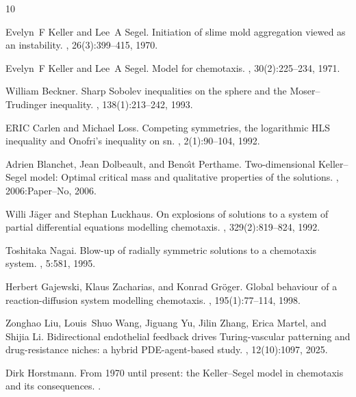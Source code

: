 \documentclass[11pt,reqno]{amsart}
\theoremstyle{definition}
\theoremstyle{remark}
\begin{document}
\begin{thebibliography}{10}

Evelyn~F Keller and Lee~A Segel.
\newblock Initiation of slime mold aggregation viewed as an instability.
, 26(3):399--415, 1970.

Evelyn~F Keller and Lee~A Segel.
\newblock Model for chemotaxis.
, 30(2):225--234, 1971.

William Beckner.
\newblock Sharp {S}obolev inequalities on the sphere and the {M}oser--{T}rudinger inequality.
, 138(1):213--242, 1993.

ERIC Carlen and Michael Loss.
\newblock Competing symmetries, the logarithmic {H}{L}{S} inequality and {O}nofri's inequality on sn.
, 2(1):90--104, 1992.

Adrien Blanchet, Jean Dolbeault, and Beno{\^\i}t Perthame.
\newblock Two-dimensional {K}eller--{S}egel model: {O}ptimal critical mass and qualitative properties of the solutions.
, 2006:Paper--No, 2006.

Willi J{\"a}ger and Stephan Luckhaus.
\newblock On explosions of solutions to a system of partial differential equations modelling chemotaxis.
, 329(2):819--824, 1992.

Toshitaka Nagai.
\newblock Blow-up of radially symmetric solutions to a chemotaxis system.
, 5:581, 1995.

Herbert Gajewski, Klaus Zacharias, and Konrad Gr{\"o}ger.
\newblock Global behaviour of a reaction-diffusion system modelling chemotaxis.
, 195(1):77--114, 1998.

Zonghao Liu, Louis~Shuo Wang, Jiguang Yu, Jilin Zhang, Erica Martel, and Shijia Li.
\newblock Bidirectional endothelial feedback drives {T}uring-vascular patterning and drug-resistance niches: a hybrid {P}{D}{E}-agent-based study.
, 12(10):1097, 2025.

Dirk Horstmann.
\newblock From 1970 until present: the {K}eller--{S}egel model in chemotaxis and its consequences.
.


\end{thebibliography}
\end{document}

